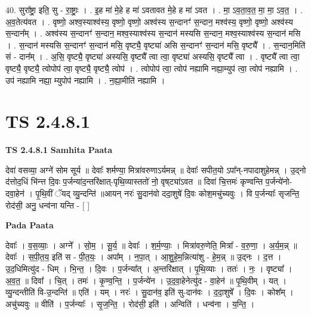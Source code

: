 \documentclass[17pt]{extarticle}
\begin{document}
40. सुरा᳚ष्ट्रा॒ इति॒ सु - रा॒ष्ट्राः॒ । . इ॒ह मा॑ मे॒हे ह मा॑ ऽवतावत मे॒हे ह मा॑ ऽवत । . मा॒ ऽव॒ता॒व॒त॒ मा॒ मा॒ ऽव॒त॒ । . अ॒व॒तेत्य॑वत । . वृष्णो॒ अश्व॒स्याश्व॑स्य॒ वृष्णो॒ वृष्णो॒ अश्व॑स्य स॒न्दानꣳ॑ स॒न्दान॒ मश्व॑स्य॒ वृष्णो॒ वृष्णो॒ अश्व॑स्य स॒न्दान᳚म् । . अश्व॑स्य स॒न्दानꣳ॑ स॒न्दान॒ मश्व॒स्याश्व॑स्य स॒न्दान॑ मस्यसि स॒न्दान॒ मश्व॒स्याश्व॑स्य स॒न्दान॑ मसि । . स॒न्दान॑ मस्यसि स॒न्दानꣳ॑ स॒न्दान॑ मसि॒ वृष्ट्यै॒ वृष्ट्या॑ असि स॒न्दानꣳ॑ स॒न्दान॑ मसि॒ वृष्ट्यै᳚ । . स॒न्दान॒मिति॑ सं - दान᳚म् । . अ॒सि॒ वृष्ट्यै॒ वृष्ट्या॑ अस्यसि॒ वृष्ट्यै᳚ त्वा त्वा॒ वृष्ट्या॑ अस्यसि॒ वृष्ट्यै᳚ त्वा । . वृष्ट्यै᳚ त्वा त्वा॒ वृष्ट्यै॒ वृष्ट्यै॒ त्वोपोप॑ त्वा॒ वृष्ट्यै॒ वृष्ट्यै॒ त्वोप॑ । . त्वोपोप॑ त्वा॒ त्वोप॑ नह्यामि नह्या॒म्युप॑ त्वा॒ त्वोप॑ नह्यामि । . उप॑ नह्यामि नह्या॒ म्युपोप॑ नह्यामि । . न॒ह्या॒मीति॑ नह्यामि । \newline
\pagebreak
{}

\section{ TS 2.4.8.1 }

\textbf{TS 2.4.8.1 } \newline
\textbf{Samhita Paata} \newline

देवा॑ वसव्या॒ अग्ने॑ सोम सूर्य ॥ देवाः᳚ शर्मण्या॒ मित्रा॑वरुणाऽर्यमन्न् ॥ देवाः᳚ सपीत॒यो ऽपा᳚न्-नपादाशुहेमन्न् । उ॒द्नो द॑त्तोद॒धिं भि॑न्त्त दि॒वः प॒र्जन्या॑द॒न्तरि॑क्षात्-पृथि॒व्यास्ततो॑ नो॒ वृष्‌ट्या॑ऽवत ॥ दिवा॑ चि॒त्तमः॑ कृण्वन्ति प॒र्जन्ये॑नो-दवा॒हेन॑ । पृ॒थि॒वीं ॅयद् व्यु॒न्दन्ति॑ ॥आयन् नरः॑ सु॒दान॑वो ददा॒शुषे॑ दि॒वः कोश॒मचु॑च्यवुः । वि प॒र्जन्याः᳚ सृजन्ति॒ रोद॑सी॒ अनु॒ धन्व॑ना यन्ति - [  ] \newline

\textbf{Pada Paata} \newline

देवाः᳚ । व॒स॒व्याः॒ । अग्ने᳚ । सो॒म॒ । सू॒र्य॒ ॥ देवाः᳚ । श॒र्म॒ण्याः॒ । मित्रा॑वरु॒णेति॒ मित्रा᳚ - व॒रु॒णा॒ । अ॒र्य॒म॒न्न् ॥ देवाः᳚ । स॒पी॒त॒य॒ इति॑ स - पी॒त॒यः॒ । अपा᳚म् । न॒पा॒त् । आ॒शु॒हे॒म॒न्नित्या॑शु - हे॒म॒न्न् ॥ उ॒द्नः । द॒त्त । उ॒द॒धिमित्यु॑द - धिम् । भि॒न्त॒ । दि॒वः ।   प॒र्जन्या᳚त् । अ॒न्तरि॑क्षात् । पृ॒थि॒व्याः । ततः॑ । नः॒ । वृष्ट्या᳚ । अ॒व॒त॒ ॥ दिवा᳚ । चि॒त् । तमः॑ । कृ॒ण्व॒न्ति॒ । प॒र्जन्ये॑न । उ॒द॒वा॒हेनेत्यु॑द - वा॒हेन॑ ॥ पृ॒थि॒वीम् । यत् । व्यु॒न्दन्तीति॑ वि-उ॒न्दन्ति॑ ॥ एति॑ । यम् । नरः॑ । सु॒दान॑व॒ इति॑ सु-दान॑वः । द॒दा॒शुषे᳚ । दि॒वः । कोश᳚म् । अचु॑च्यवुः ॥ वीति॑ । प॒र्जन्याः᳚ । सृ॒ज॒न्ति॒ । रोद॑सी॒ इति॑ । अन्विति॑ । धन्व॑ना । य॒न्ति॒ ।  \newline
\end{document}
